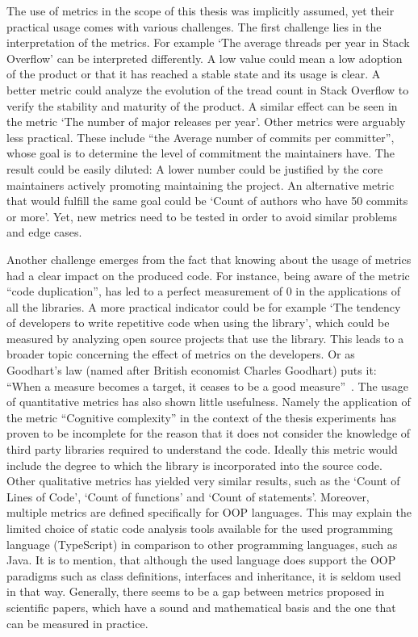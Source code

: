 The use of metrics in the scope of this thesis was implicitly assumed,
yet their practical usage comes with various challenges. The first
challenge lies in the interpretation of the metrics. For example `The
average threads per year in Stack Overflow' can be interpreted
differently. A low value could mean a low adoption of the product or
that it has reached a stable state and its usage is clear. A better
metric could analyze the evolution of the tread count in Stack Overflow
to verify the stability and maturity of the product. A similar effect
can be seen in the metric `The number of major releases per year'. Other
metrics were arguably less practical. These include ``the Average number
of commits per committer'', whose goal is to determine the level of
commitment the maintainers have. The result could be easily diluted: A
lower number could be justified by the core maintainers actively
promoting maintaining the project. An alternative metric that would
fulfill the same goal could be `Count of authors who have 50 commits or
more'. Yet, new metrics need to be tested in order to avoid similar
problems and edge cases.

Another challenge emerges from the fact that knowing about the usage of
metrics had a clear impact on the produced code. For instance, being
aware of the metric ``code duplication'', has led to a perfect
measurement of 0 in the applications of all the libraries. A more
practical indicator could be for example `The tendency of developers to
write repetitive code when using the library', which could be measured
by analyzing open source projects that use the library. This leads to a
broader topic concerning the effect of metrics on the developers. Or as
Goodhart's law (named after British economist Charles Goodhart) puts it: ``When a measure becomes a target, it ceases
to be a good measure''~\cite{goodhart}.
The usage of quantitative metrics has also shown little
usefulness. Namely the application of the metric ``Cognitive
complexity'' in the context of the thesis experiments has proven to be
incomplete for the reason that it does not consider the knowledge of
third party libraries required to understand the code. Ideally this
metric would include the degree to which the library is incorporated
into the source code. Other qualitative metrics has yielded very similar
results, such as the `Count of Lines of Code', `Count of functions' and
`Count of statements'. Moreover, multiple metrics are defined
specifically for OOP languages. This may explain the limited choice of
static code analysis tools available for the used programming language
(TypeScript) in comparison to other programming languages, such as
Java. It is to mention, that although the used language does support the
OOP paradigms such as class definitions, interfaces and inheritance, it
is seldom used in that way. Generally, there seems to be a gap between
metrics proposed in scientific papers, which have a sound and
mathematical basis and the one that can be measured in practice.

